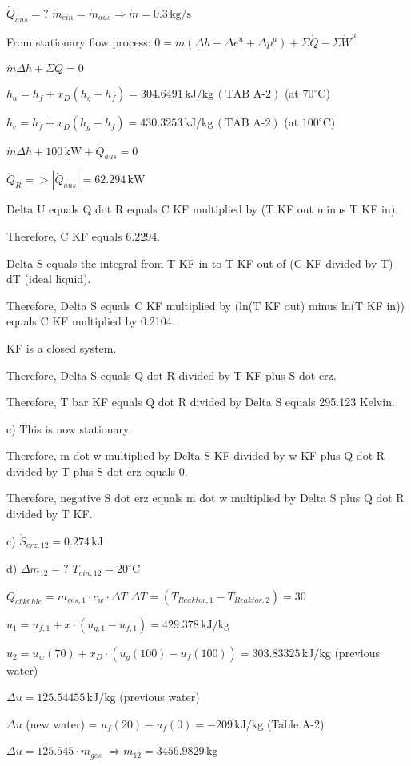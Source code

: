 \( \dot{Q}_{aus} = ? \)  
\( \dot{m}_{ein} = \dot{m}_{aus} \Rightarrow \dot{m} = 0.3 \, \text{kg/s} \)  

From stationary flow process:  
\( 0 = \dot{m} (\Delta h + \Delta e^u + \Delta p^u) + \Sigma \dot{Q} - \Sigma \dot{W}^u \)  

\( \dot{m} \Delta h + \Sigma \dot{Q} = 0 \)  

\( h_a = h_f + x_D (h_g - h_f) = 304.6491 \, \text{kJ/kg} \, (\text{TAB A-2}) \)  
(at \( 70^\circ \text{C} \))  

\( h_e = h_f + x_D (h_g - h_f) = 430.3253 \, \text{kJ/kg} \, (\text{TAB A-2}) \)  
(at \( 100^\circ \text{C} \))  

\( \dot{m} \Delta h + 100 \, \text{kW} + \dot{Q}_{aus} = 0 \)  

\( \dot{Q}_R = > | \dot{Q}_{aus} | = 62.294 \, \text{kW} \)

Delta U equals Q dot R equals C KF multiplied by (T KF out minus T KF in).  

Therefore, C KF equals 6.2294.  

Delta S equals the integral from T KF in to T KF out of (C KF divided by T) dT (ideal liquid).  

Therefore, Delta S equals C KF multiplied by (ln(T KF out) minus ln(T KF in)) equals C KF multiplied by 0.2104.  

KF is a closed system.  

Therefore, Delta S equals Q dot R divided by T KF plus S dot erz.  

Therefore, T bar KF equals Q dot R divided by Delta S equals 295.123 Kelvin.  

c) This is now stationary.  

Therefore, m dot w multiplied by Delta S KF divided by w KF plus Q dot R divided by T plus S dot erz equals 0.  

Therefore, negative S dot erz equals m dot w multiplied by Delta S plus Q dot R divided by T KF.

c) \( \dot{S}_{erz,12} = 0.274 \, \text{kJ} \)

d) \( \Delta m_{12} = ? \)  
\( T_{ein,12} = 20^\circ \text{C} \)  

\( Q_{abkühle} = m_{ges,1} \cdot c_w \cdot \Delta T \)  
\( \Delta T = (T_{Reaktor,1} - T_{Reaktor,2}) = 30 \)  

\( u_1 = u_{f,1} + x \cdot (u_{g,1} - u_{f,1}) = 429.378 \, \text{kJ/kg} \)  

\( u_2 = u_w(70) + x_D \cdot (u_g(100) - u_f(100)) = 303.83325 \, \text{kJ/kg} \)  
(previous water)  

\( \Delta u = 125.54455 \, \text{kJ/kg} \)  
(previous water)  

\( \Delta u \) (new water) = \( u_f(20) - u_f(0) = -209 \, \text{kJ/kg} \)  
(Table A-2)  

\( \Delta u = 125.545 \cdot m_{ges} \)  
\( \Rightarrow m_{12} = 3456.9829 \, \text{kg} \)
